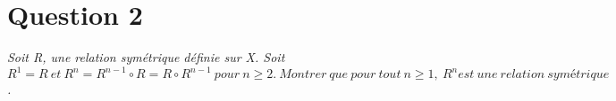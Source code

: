 \section*{Question 2}
\emph{Soit R, une relation symétrique définie sur X. Soit $R^1 = R\ et\ R^n = R^{n-1} \circ R = R \circ R^{n-1}\ pour\ n \geq 2.\ Montrer\ que\ pour\ tout\ n\geq1,\ R^n est\ une\ relation\ symétrique$.}
